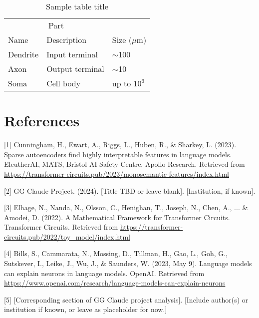 \documentclass{article}
\begin{document}
\begin{table}
  \caption{Sample table title}
  \label{sample-table}
  \centering
  \begin{tabular}{lll}
    \toprule
    \multicolumn{2}{c}{Part}                   \\
    \cmidrule(r){1-2}
    Name     & Description     & Size ($\mu$m) \\
    \midrule
    Dendrite & Input terminal  & $\sim$100     \\
    Axon     & Output terminal & $\sim$10      \\
    Soma     & Cell body       & up to $10^6$  \\
    \bottomrule
  \end{tabular}
\end{table}




\section*{References}
{\small

[1] Cunningham, H., Ewart, A., Riggs, L., Huben, R., \& Sharkey, L. (2023). Sparse autoencoders find highly interpretable features in language models. EleutherAI, MATS, Bristol AI Safety Centre, Apollo Research. Retrieved from \url{https://transformer-circuits.pub/2023/monosemantic-features/index.html}

[2] GG Claude Project. (2024). [Title TBD or leave blank]. [Institution, if known].

[3] Elhage, N., Nanda, N., Olsson, C., Henighan, T., Joseph, N., Chen, A., ... \& Amodei, D. (2022). A Mathematical Framework for Transformer Circuits. Transformer Circuits. Retrieved from \url{https://transformer-circuits.pub/2022/toy_model/index.html}

[4] Bills, S., Cammarata, N., Mossing, D., Tillman, H., Gao, L., Goh, G., Sutskever, I., Leike, J., Wu, J., \& Saunders, W. (2023, May 9). Language models can explain neurons in language models. OpenAI. Retrieved from \url{https://www.openai.com/research/language-models-can-explain-neurons}

[5] [Corresponding section of GG Claude project analysis]. [Include author(s) or institution if known, or leave as placeholder for now.]

}

\end{document}
